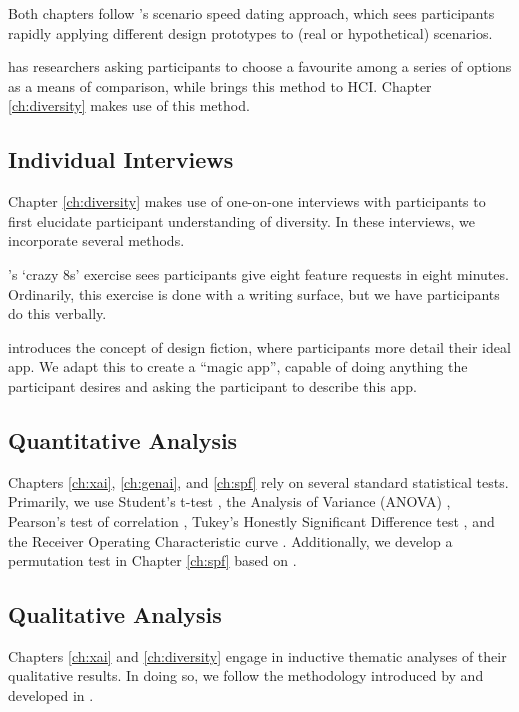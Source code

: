 Both chapters follow \textcite{Zimmerman_Forlizzi_2017}'s scenario speed dating approach, which sees participants rapidly applying different design prototypes to (real or hypothetical) scenarios.

\textcite{Gatian_1994} has researchers asking participants to choose a favourite among a series of options as a means of comparison, while \textcite{Griffiths_Johnson_Hartley_2007} brings this method to HCI. Chapter \ref{ch:diversity} makes use of this method.

\subsection{Individual Interviews}
Chapter \ref{ch:diversity} makes use of one-on-one interviews with participants to first elucidate participant understanding of diversity. In these interviews, we incorporate several methods.

\textcite{Knapp_Zeratzky_Kowitz_2016}'s `crazy 8s' exercise sees participants give eight feature requests in eight minutes. Ordinarily, this exercise is done with a writing surface, but we have participants do this verbally.

\textcite{blythe2014research} introduces the concept of design fiction, where participants more detail their ideal app. We adapt this to create a ``magic app'', capable of doing anything the participant desires and asking the participant to describe this app.

\subsection{Quantitative Analysis}
Chapters \ref{ch:xai}, \ref{ch:genai}, and \ref{ch:spf} rely on several standard statistical tests. Primarily, we use Student's t-test \cite{Mishra_Singh_Pandey_Mishra_Pandey_2019}, the Analysis of Variance (ANOVA) \cite{Mishra_Singh_Pandey_Mishra_Pandey_2019}, Pearson's test of correlation \cite{Schober_Boer_Schwarte_2018}, Tukey's Honestly Significant Difference test \cite{Kim_2015}, and the Receiver Operating Characteristic curve \cite{hanley1989receiver}. Additionally, we develop a permutation test in Chapter \ref{ch:spf} based on \textcite{good2013permutation}.

\subsection{Qualitative Analysis}
Chapters \ref{ch:xai} and \ref{ch:diversity} engage in inductive thematic analyses of their qualitative results. In doing so, we follow the methodology introduced by \textcite{braun_using_2006} and developed in \textcite{braun_conceptual_2022,braun_toward_2023,noauthor_thematic_nodate}.

